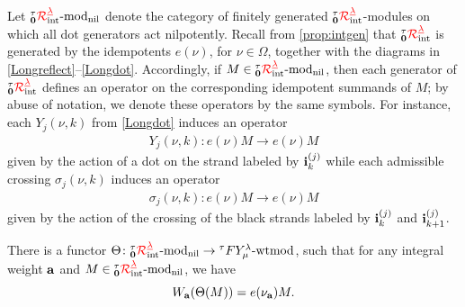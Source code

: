 Let $\intmodnil$ denote the category of finitely generated $\intklrw$-modules on which all dot generators act nilpotently.  
Recall from \cref{prop:intgen} that $\intklrw$ is generated by the idempotents $e(\nu)$, for $\nu\in \Omega$, together with the diagrams in \cref{Longreflect}--\cref{Longdot}.  
Accordingly, if $M\in \intmodnil$, then each generator of $\intklrw$ defines an operator on the corresponding idempotent summands of $M$; by abuse of notation, we denote these operators by the same symbols.  
For instance, each $Y_j(\nu,k)$ from \cref{Longdot} induces an operator
\begin{gather}
    Y_j(\nu,k)\colon e(\nu)M \to e(\nu)M
\end{gather}
given by the action of a dot on the strand labeled by $\bi^{(j)}_k$ while each admissible crossing $\sigma_j(\nu,k)$ induces an operator
\begin{gather}
    \sigma_j(\nu,k)\colon e(\nu)M \to e(\nu)M
\end{gather}
given by the action of the crossing of the black strands labeled by $\bi_{k}^{(j)}$ and $\bi_{k+1}^{(j)}$. 



\begin{prop}\label{prop:Theta}
There is a functor  $\Theta \colon \intmodnil\to \fywtmod$, such that for any integral weight $\ba$ and $M\in \intmodnil$, we have
  \begin{equation}
  \label{eq:Theta}
W_{\ba}(\Theta(M)) =
e(\nu_\ba) M.
\end{equation}
\end{prop}

